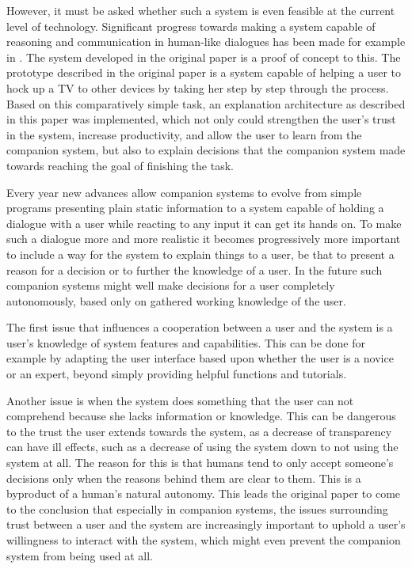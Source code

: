 \documentclass[a4paper]{article}
\begin{document}
However, it must be asked whether such a system is even feasible at the current level of technology. Significant progress towards making a system capable of reasoning and communication in human-like dialogues has been made for example in \cite{allen2001toward}. The system developed in the original paper is a proof of concept to this. The prototype described in the original paper is a system capable of helping a user to hock up a TV to other devices by taking her step by step through the process. Based on this comparatively simple task, an explanation architecture as described in this paper was implemented, which not only could strengthen the user's trust in the system, increase productivity, and allow the user to learn from the companion system, but also to explain decisions that the companion system made towards reaching the goal of finishing the task.

Every year new advances allow companion systems to evolve from simple programs presenting plain static information to a system capable of holding a dialogue with a user while reacting to any input it can get its hands on. To make such a dialogue more and more realistic it becomes progressively more important to include a way for the system to explain things to a user, be that to present a reason for a decision or to further the knowledge of a user. In the future such companion systems might well make decisions for a user completely autonomously, based only on gathered working knowledge of the user.\label{adaptive_companion}

The first issue that influences a cooperation between a user and the system is a user's knowledge of system features and capabilities. This can be done for example by adapting the user interface based upon whether the user is a novice or an expert, beyond simply providing helpful functions and tutorials.

Another issue is when the system does something that the user can not comprehend because she lacks information or knowledge. This can be dangerous to the trust the user extends towards the system, as a decrease of transparency can have ill effects, such as a decrease of using the system down to not using the system at all. The reason for this is that humans tend to only accept someone's decisions only when the reasons behind them are clear to them. This is a byproduct of a human's natural autonomy. This leads the original paper to come to the conclusion that especially in companion systems, the issues surrounding trust between a user and the system are increasingly important to uphold a user's willingness to interact with the system, which might even prevent the companion system from being used at all.
\end{document}
